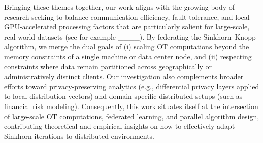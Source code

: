 Bringing these themes together, our work aligns with the growing body of research seeking to balance communication efficiency, fault tolerance, and local GPU-accelerated processing factors that are particularly salient for large-scale, real-world datasets (see for example ____). By federating the Sinkhorn–Knopp algorithm, we merge the dual goals of (i) scaling OT computations beyond the memory constraints of a single machine or data center node, and (ii) respecting constraints where data remain partitioned across geographically or administratively distinct clients. Our investigation also complements broader efforts toward privacy-preserving analytics (e.g., differential privacy layers applied to local distribution vectors) and domain-specific distributed setups (such as financial risk modeling). Consequently, this work situates itself at the intersection of large-scale OT computations, federated learning, and parallel algorithm design, contributing theoretical and empirical insights on how to effectively adapt Sinkhorn iterations to distributed environments.